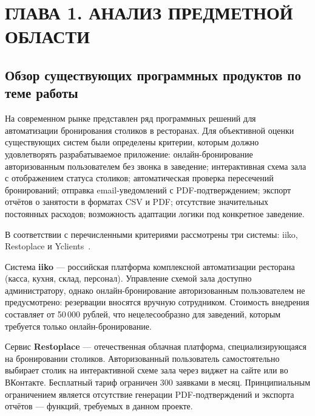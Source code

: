 
\section*{ГЛАВА 1. АНАЛИЗ ПРЕДМЕТНОЙ ОБЛАСТИ}

\subsection{Обзор существующих программных продуктов по теме работы}
\label{subsec:review}

На современном рынке представлен ряд программных решений для
автоматизации бронирования столиков в ресторанах. Для объективной
оценки существующих систем были определены критерии, которым должно
удовлетворять разрабатываемое приложение: онлайн-бронирование
авторизованным пользователем без звонка в заведение; интерактивная схема зала с отображением
статуса столиков; автоматическая проверка пересечений бронирований;
отправка email-уведомлений с PDF-подтверждением; экспорт отчётов о
занятости в форматах CSV и PDF; отсутствие значительных постоянных
расходов; возможность адаптации логики под конкретное заведение.

В соответствии с перечисленными критериями рассмотрены три системы:
iiko, Restoplace и Yclients~\cite{iiko,restoplace,yclients}.

Система \textbf{iiko} --- российская платформа комплексной автоматизации
ресторана (касса, кухня, склад, персонал). Управление схемой зала
доступно администратору, однако онлайн-бронирование авторизованным пользователем не
предусмотрено: резервации вносятся вручную сотрудником. Стоимость
внедрения составляет от 50\,000 рублей, что нецелесообразно для
заведений, которым требуется только онлайн-бронирование.

Сервис \textbf{Restoplace} --- отечественная облачная платформа,
специализирующаяся на бронировании столиков. Авторизованный пользователь самостоятельно
выбирает столик на интерактивной схеме зала через виджет на сайте или
во ВКонтакте. Бесплатный тариф ограничен 300 заявками в месяц.
Принципиальным ограничением является отсутствие генерации
PDF-подтверждений и экспорта отчётов --- функций, требуемых в данном
проекте.

